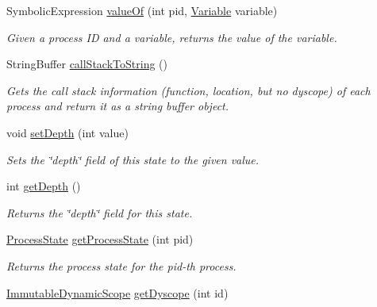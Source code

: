 \begin{DoxyCompactItemize}
Symbolic\+Expression \hyperlink{classedu_1_1udel_1_1cis_1_1vsl_1_1civl_1_1state_1_1common_1_1immutable_1_1ImmutableMonoState_a61d3656b588d2a57c6669f8e8bd3b7f0}{value\+Of} (int pid, \hyperlink{interfaceedu_1_1udel_1_1cis_1_1vsl_1_1civl_1_1model_1_1IF_1_1variable_1_1Variable}{Variable} variable)
\begin{DoxyCompactList}\small\item\em Given a process I\+D and a variable, returns the value of the variable. \end{DoxyCompactList}\item 
String\+Buffer \hyperlink{classedu_1_1udel_1_1cis_1_1vsl_1_1civl_1_1state_1_1common_1_1immutable_1_1ImmutableMonoState_a35342bb1fd19c20bc4b96638b4c0f3ee}{call\+Stack\+To\+String} ()
\begin{DoxyCompactList}\small\item\em Gets the call stack information (function, location, but no dyscope) of each process and return it as a string buffer object. \end{DoxyCompactList}\item 
void \hyperlink{classedu_1_1udel_1_1cis_1_1vsl_1_1civl_1_1state_1_1common_1_1immutable_1_1ImmutableMonoState_a7fae06fbb7605d4a3081997f346e562c}{set\+Depth} (int value)
\begin{DoxyCompactList}\small\item\em Sets the \char`\"{}depth\char`\"{} field of this state to the given value. \end{DoxyCompactList}\item 
int \hyperlink{classedu_1_1udel_1_1cis_1_1vsl_1_1civl_1_1state_1_1common_1_1immutable_1_1ImmutableMonoState_a3890bacb2f593bac490881f904d4e971}{get\+Depth} ()
\begin{DoxyCompactList}\small\item\em Returns the \char`\"{}depth\char`\"{} field for this state. \end{DoxyCompactList}\item 
\hyperlink{interfaceedu_1_1udel_1_1cis_1_1vsl_1_1civl_1_1state_1_1IF_1_1ProcessState}{Process\+State} \hyperlink{classedu_1_1udel_1_1cis_1_1vsl_1_1civl_1_1state_1_1common_1_1immutable_1_1ImmutableMonoState_aba851537d62bf88ec7d49bc37faf66d0}{get\+Process\+State} (int pid)
\begin{DoxyCompactList}\small\item\em Returns the process state for the pid-\/th process. \end{DoxyCompactList}\item 
\hyperlink{classedu_1_1udel_1_1cis_1_1vsl_1_1civl_1_1state_1_1common_1_1immutable_1_1ImmutableDynamicScope}{Immutable\+Dynamic\+Scope} \hyperlink{classedu_1_1udel_1_1cis_1_1vsl_1_1civl_1_1state_1_1common_1_1immutable_1_1ImmutableMonoState_ad692cd64db1f8f5035364e77e011b4fc}{get\+Dyscope} (int id)

\end{DoxyCompactItemize}
